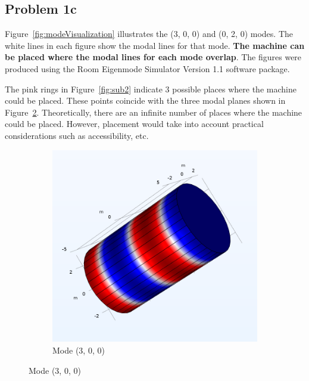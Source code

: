 {\subsection*{Problem 1c}

Figure~\ref{fig:modeVisualization} illustrates the (3, 0, 0) and (0, 2, 0) modes.  The white lines in each figure show the modal lines for that mode.  \textbf{The machine can be placed where the modal lines for each mode overlap}.  The figures were produced using the Room Eigenmode Simulator Version 1.1 software package.

The pink rings in Figure~\ref{fig:sub2} indicate 3 possible places where the machine could be placed.  These points coincide with the three modal planes shown in Figure~\ref{fig:sub1}.  Theoretically, there are an infinite number of places where the machine could be placed.  However, placement would take into account practical considerations such as accessibility, etc.


\begin{figure}[htbp]

    \centering
    
    \begin{subfigure}{0.5\textwidth}
        \includegraphics[width=\textwidth]{Mode Profile 51_5 Hz.png}
            \caption{Mode (3, 0, 0)}
            \label{fig:sub1}
    \end{subfigure}
      

\end{figure}}
